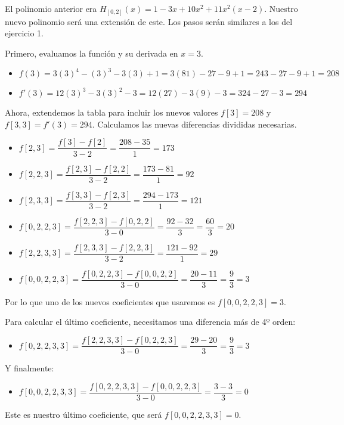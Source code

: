 \documentclass{article}
\begin{document}
El polinomio anterior era \(H_{[0,2]}(x) = 1 - 3x + 10x^2 + 11x^2(x-2)\). Nuestro nuevo polinomio será una extensión de este. Los pasos serán similares a los del ejercicio 1.

Primero, evaluamos la función y su derivada en  \(x=3\).
\begin{itemize}
    \item \(f(3) = 3(3)^4 - (3)^3 - 3(3) + 1 = 3(81) - 27 - 9 + 1 = 243 - 27 - 9 + 1 = 208\)
    \item \(f'(3) = 12(3)^3 - 3(3)^2 - 3 = 12(27) - 3(9) - 3 = 324 - 27 - 3 = 294\)
\end{itemize}

Ahora, extendemos la tabla para incluir los nuevos valores \(f[3]=208\) y \(f[3,3]=f'(3)=294\). Calculamos las nuevas diferencias divididas necesarias.

\begin{itemize}
    \item \(f[2,3] = \dfrac{f[3] - f[2]}{3-2} = \dfrac{208 - 35}{1} = 173\)
\end{itemize}

\begin{itemize}
    \item \(f[2,2,3] = \dfrac{f[2,3] - f[2,2]}{3-2} = \dfrac{173 - 81}{1} = 92\)
    \item \(f[2,3,3] = \dfrac{f[3,3] - f[2,3]}{3-2} = \dfrac{294 - 173}{1} = 121\)
\end{itemize}

\begin{itemize}
    \item \(f[0,2,2,3] = \dfrac{f[2,2,3] - f[0,2,2]}{3-0} = \dfrac{92 - 32}{3} = \dfrac{60}{3} = 20\)
    \item \(f[2,2,3,3] = \dfrac{f[2,3,3] - f[2,2,3]}{3-2} = \dfrac{121 - 92}{1} = 29\)
\end{itemize}

\begin{itemize}
    \item \(f[0,0,2,2,3] = \dfrac{f[0,2,2,3] - f[0,0,2,2]}{3-0} = \dfrac{20 - 11}{3} = \dfrac{9}{3} = 3\)
\end{itemize}

Por lo que uno de los nuevos coeficientes que usaremos es $f[0,0,2,2,3] = 3$.

Para calcular el último coeficiente, necesitamos una diferencia más de 4º orden:
\begin{itemize}
    \item \(f[0,2,2,3,3] = \dfrac{f[2,2,3,3] - f[0,2,2,3]}{3-0} = \dfrac{29 - 20}{3} = \dfrac{9}{3} = 3\)
\end{itemize}
Y finalmente:
\begin{itemize}
    \item \(f[0,0,2,2,3,3] = \dfrac{f[0,2,2,3,3] - f[0,0,2,2,3]}{3-0} = \dfrac{3 - 3}{3} = 0\)
\end{itemize}
Este es nuestro último coeficiente, que será \(f[0,0,2,2,3,3] = 0\).
\end{document}
